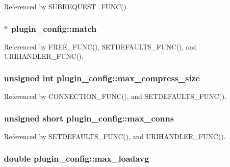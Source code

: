 Referenced by S\-U\-B\-R\-E\-Q\-U\-E\-S\-T\-\_\-\-F\-U\-N\-C().

\hypertarget{structplugin__config_a7a3c933dffd1f29673281c093373acf6}{
\subsubsection[{match}]{$\ast$ plugin\-\_\-config\-::match}}\label{structplugin__config_a7a3c933dffd1f29673281c093373acf6}


Referenced by F\-R\-E\-E\-\_\-\-F\-U\-N\-C(), S\-E\-T\-D\-E\-F\-A\-U\-L\-T\-S\-\_\-\-F\-U\-N\-C(), and U\-R\-I\-H\-A\-N\-D\-L\-E\-R\-\_\-\-F\-U\-N\-C().

\hypertarget{structplugin__config_af7f726fff8c406a906bb3b52c3daf685}{
\subsubsection[{max\-\_\-compress\-\_\-size}]{\setlength{\rightskip}{0pt plus 5cm}unsigned int plugin\-\_\-config\-::max\-\_\-compress\-\_\-size}}\label{structplugin__config_af7f726fff8c406a906bb3b52c3daf685}


Referenced by C\-O\-N\-N\-E\-C\-T\-I\-O\-N\-\_\-\-F\-U\-N\-C(), and S\-E\-T\-D\-E\-F\-A\-U\-L\-T\-S\-\_\-\-F\-U\-N\-C().

\hypertarget{structplugin__config_ae594c7b02113f968a3f54ed5eac7d450}{
\subsubsection[{max\-\_\-conns}]{\setlength{\rightskip}{0pt plus 5cm}unsigned short plugin\-\_\-config\-::max\-\_\-conns}}\label{structplugin__config_ae594c7b02113f968a3f54ed5eac7d450}


Referenced by S\-E\-T\-D\-E\-F\-A\-U\-L\-T\-S\-\_\-\-F\-U\-N\-C(), and U\-R\-I\-H\-A\-N\-D\-L\-E\-R\-\_\-\-F\-U\-N\-C().

\hypertarget{structplugin__config_a956c2f55ae14bb725e83f3c7733d1444}{
\subsubsection[{max\-\_\-loadavg}]{\setlength{\rightskip}{0pt plus 5cm}double plugin\-\_\-config\-::max\-\_\-loadavg}}\label{structplugin__config_a956c2f55ae14bb725e83f3c7733d1444}



